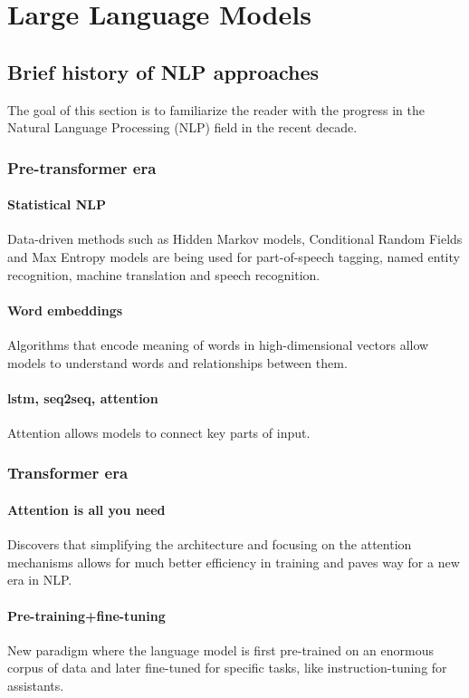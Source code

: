 \section{Large Language Models}
\subsection{Brief history of NLP approaches}
The goal of this section is to familiarize the reader with the progress in the Natural Language Processing (NLP) field in the recent decade.

\subsubsection{Pre-transformer era}
\paragraph{Statistical NLP}
Data-driven methods such as Hidden Markov models, Conditional Random Fields and Max Entropy models are 
being used for part-of-speech tagging, named entity recognition, machine translation and speech recognition.
\paragraph{Word embeddings}
Algorithms that encode meaning of words in high-dimensional vectors allow models to understand words and relationships between them.
\paragraph{lstm, seq2seq, attention}
Attention allows models to connect key parts of input.

\subsubsection{Transformer era}
\paragraph{Attention is all you need}
Discovers that simplifying the architecture and focusing on the attention mechanisms allows for much better efficiency in training and paves way for a new era in NLP.
\paragraph{Pre-training+fine-tuning}
New paradigm where the language model is first pre-trained on an enormous corpus of data and later fine-tuned for specific tasks, like instruction-tuning for assistants.
